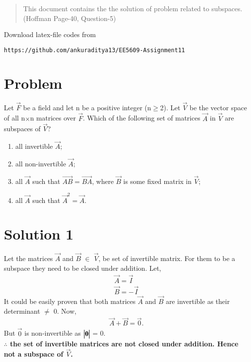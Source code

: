 \documentclass[journal,12pt,twocolumn]{IEEEtran}
\begin{document}
\begin{abstract}
This document contains the the solution of problem related to subspaces.(Hoffman Page-40, Question-5)  
\end{abstract}
Download latex-file codes from 
\begin{lstlisting}
https://github.com/ankuraditya13/EE5609-Assignment11
\end{lstlisting}

\section{Problem}
Let $\vec{F}$ be a field and let n be a positive integer (n$\geq$2). Let $\vec{V}$ be the vector space of all n$\times$n matrices over $\vec{F}$. Which of the following set of matrices $\vec{A}$ in $\vec{V}$ are subspaces of   $\vec{V}$?
\begin{enumerate}
\item all invertible $\vec{A}$;
\item all non-invertible $\vec{A}$;
\item all $\vec{A}$ such that $\vec{AB}=\vec{BA}$, where $\vec{B}$ is some fixed matrix in $\vec{V}$;
\item all $\vec{A}$ such that $\vec{A}^2 = \vec{A}$.
\end{enumerate}
\section{Solution 1}
Let the matrices $\vec{A}$ and $\vec{B}$ $\in$ $\vec{V}$, be set of invertible matrix. For them to be a subspace they need to be closed under addition.
Let,
\begin{align}
\vec{A} = \vec{I}\\
\vec{B} = -\vec{I}
\end{align}  
It could be easily proven that both matrices $\vec{A}$ and $\vec{B}$ are invertible as their determinant $\neq$ 0. Now,
\begin{align}
\vec{A}+\vec{B} = \vec{0}. 
\end{align} 
But $\vec{0}$ is non-invertible as $\begin{vmatrix}\mathbf{0}\end{vmatrix}$ = 0.\\ \textbf{$\therefore$ the set of invertible matrices are not closed under addition. Hence not a subspace of $\vec{V}$.}
\end{document}
